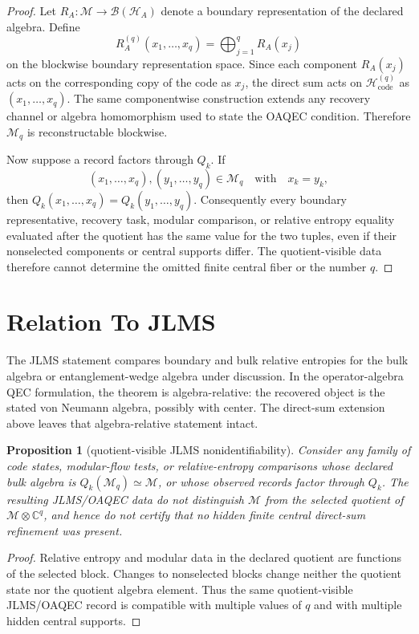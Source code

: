 \documentclass[12pt]{article}
\newtheorem{proposition}{Proposition}
\theoremstyle{remark}
\newcommand{\B}{\mathcal B}
\newcommand{\C}{\mathbb C}
\newcommand{\Hcode}{\mathcal H_{\mathrm{code}}}
\newcommand{\M}{\mathcal M}
\begin{document}
\begin{proof}
Let \(R_A:\M\to\B(\mathcal H_A)\) denote a boundary representation of the
declared algebra.  Define
\[
  R_A^{(q)}(x_1,\ldots,x_q)
  =
  \bigoplus_{j=1}^{q} R_A(x_j)
\]
on the blockwise boundary representation space.  Since each component
\(R_A(x_j)\) acts on the corresponding copy of the code as \(x_j\), the direct
sum acts on \(\Hcode^{(q)}\) as \((x_1,\ldots,x_q)\).  The same componentwise
construction extends any recovery channel or algebra homomorphism used to
state the OAQEC condition.  Therefore \(\M_q\) is reconstructable blockwise.

Now suppose a record factors through \(Q_k\).  If
\[
  (x_1,\ldots,x_q),(y_1,\ldots,y_q)\in\M_q
  \quad\text{with}\quad x_k=y_k,
\]
then \(Q_k(x_1,\ldots,x_q)=Q_k(y_1,\ldots,y_q)\).  Consequently every
boundary representative, recovery task, modular comparison, or relative
entropy equality evaluated after the quotient has the same value for the two
tuples, even if their nonselected components or central supports differ.  The
quotient-visible data therefore cannot determine the omitted finite central
fiber or the number \(q\).
\end{proof}

\section{Relation To JLMS}

The JLMS statement compares boundary and bulk relative entropies for the bulk
algebra or entanglement-wedge algebra under discussion.  In the
operator-algebra QEC formulation, the theorem is algebra-relative: the
recovered object is the stated von Neumann algebra, possibly with center.  The
direct-sum extension above leaves that algebra-relative statement intact.

\begin{proposition}[quotient-visible JLMS nonidentifiability]
\label{prop:jlms-quotient}
Consider any family of code states, modular-flow tests, or relative-entropy
comparisons whose declared bulk algebra is \(Q_k(\M_q)\simeq\M\), or whose
observed records factor through \(Q_k\).  The resulting JLMS/OAQEC data do not
distinguish \(\M\) from the selected quotient of \(\M\otimes\C^q\), and hence
do not certify that no hidden finite central direct-sum refinement was present.
\end{proposition}

\begin{proof}
Relative entropy and modular data in the declared quotient are functions of
the selected block.  Changes to nonselected blocks change neither the
quotient state nor the quotient algebra element.  Thus the same
quotient-visible JLMS/OAQEC record is compatible with multiple values of
\(q\) and with multiple hidden central supports.
\end{proof}
\end{document}
